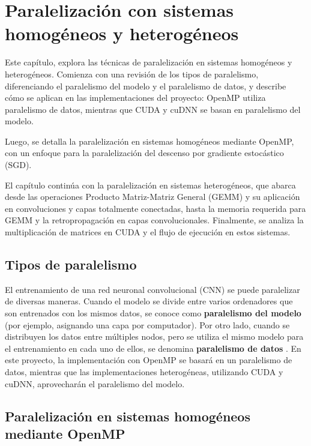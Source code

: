 \chapter{Paralelización con sistemas homogéneos y heterogéneos}

Este capítulo, explora las técnicas de paralelización en sistemas homogéneos y heterogéneos. Comienza con una revisión de los tipos de paralelismo, diferenciando el paralelismo del modelo y el paralelismo de datos, y describe cómo se aplican en las implementaciones del proyecto: OpenMP utiliza paralelismo de datos, mientras que CUDA y cuDNN se basan en paralelismo del modelo.

Luego, se detalla la paralelización en sistemas homogéneos mediante OpenMP, con un enfoque para la paralelización del descenso por gradiente estocástico (SGD).

El capítulo continúa con la paralelización en sistemas heterogéneos, que abarca desde las operaciones Producto Matriz-Matriz General (GEMM) y su aplicación en convoluciones y capas totalmente conectadas, hasta la memoria requerida para GEMM y la retropropagación en capas convolucionales. Finalmente, se analiza la multiplicación de matrices en CUDA y el flujo de ejecución en estos sistemas.


\section{Tipos de paralelismo}

El entrenamiento de una red neuronal convolucional (CNN) se puede paralelizar de diversas maneras. Cuando el modelo se divide entre varios ordenadores que son entrenados con los mismos datos, se conoce como \textbf{paralelismo del modelo} \cite{data_model_parallelism} (por ejemplo, asignando una capa por computador). Por otro lado, cuando se distribuyen los datos entre múltiples nodos, pero se utiliza el mismo modelo para el entrenamiento en cada uno de ellos, se denomina \textbf{paralelismo de datos} \cite{model_parallelism}. En este proyecto, la implementación con OpenMP se basará en un paralelismo de datos, mientras que las implementaciones heterogéneas, utilizando CUDA y cuDNN, aprovecharán el paralelismo del modelo. \\

\section{Paralelización en sistemas homogéneos mediante OpenMP}

